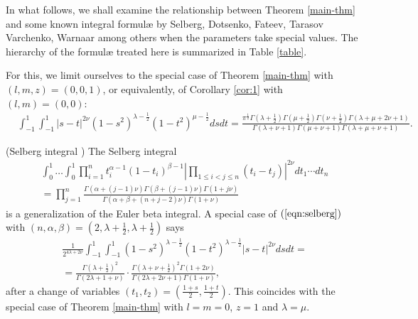 \documentclass{svjour3}
\begin{document}
In what follows, we shall examine the relationship between Theorem
\ref{main-thm} and some known integral formul{\ae} by Selberg, Dotsenko,
Fateev, Tarasov Varchenko, Warnaar among others when the parameters take
special values. The hierarchy of the formul{\ae} treated here is summarized in
Table \ref{table}.

For this, we limit ourselves to the special case of Theorem \ref{main-thm}
with $(l, m, z) = (0, 0, 1)$, or equivalently, of Corollary \ref{cor:1} with
$(l, m) = (0, 0)$:
\begin{eqnarray}
  & \int_{- 1}^1 \int_{- 1}^1 | s - t |^{2 \nu} (1 - s^2)^{\lambda -
  \frac{1}{2}} (1 - t^2)^{\mu - \frac{1}{2}} d s d t = \frac{\pi^{\frac{1}{2}}
  \Gamma \left( \lambda + \frac{1}{2} \right) \Gamma \left( \mu + \frac{1}{2}
  \right) \Gamma \left( \nu + \frac{1}{2} \right) \Gamma (\lambda + \mu + 2
  \nu + 1)}{\Gamma (\lambda + \nu + 1) \Gamma (\mu + \nu + 1) \Gamma (\lambda
  + \mu + \nu + 1)} .  \label{eqn:lm0} & 
\end{eqnarray}


\begin{example}
  \label{ex:1}(Selberg integral {\cite{Selberg:411367}}) The Selberg integral
  \begin{eqnarray}
    & \int_0^1 \ldots \int_0^1 \prod_{i = 1}^n t_i^{\alpha - 1} (1 -
    t_i)^{\beta - 1} \left| \prod_{1 \leqslant i < j \leqslant n} (t_i - t_j)
    \right|^{2 \nu} d t_1 \cdots d t_n  \label{eqn:selberg} & \\
    & = \prod_{j = 1}^n \frac{\Gamma (\alpha + (j - 1) \nu) \Gamma (\beta +
    (j - 1) \nu) \Gamma (1 + j \nu)}{\Gamma (\alpha + \beta + (n + j - 2) \nu)
    \Gamma (1 + \nu)} &  \nonumber
  \end{eqnarray}
  is a generalization of the Euler beta integral. A special case of
  $(\ref{eqn:selberg})$ with $(n, \alpha, \beta) = \left( 2, \lambda +
  \frac{1}{2}, \lambda + \frac{1}{2} \right)$ says
  \begin{eqnarray}
    & \frac{1}{2^{4 \lambda + 2 \nu}} \int_{- 1}^1 \int_{- 1}^1 (1 -
    s^2)^{\lambda - \frac{1}{2}} (1 - t^2)^{\lambda - \frac{1}{2}} | s - t
    |^{2 \nu} d s d t = &  \nonumber\\
    & = \frac{\Gamma \left( \lambda + \frac{1}{2} \right)^2}{\Gamma (2
    \lambda + 1 + \nu)} \cdot \frac{\Gamma \left( \lambda + \nu + \frac{1}{2}
    \right)^2 \Gamma (1 + 2 \nu)}{\Gamma (2 \lambda + 2 \nu + 1) \Gamma (1 +
    \nu)}, &  \nonumber
  \end{eqnarray}
  after a change of variables $(t_1, t_2) = \left( \frac{1 + s}{2}, \frac{1 +
  t}{2} \right)$. This coincides with the special case of Theorem
  \ref{main-thm} with $l = m = 0$, $z = 1$ and $\lambda = \mu$. 
\end{example}
\end{document}

